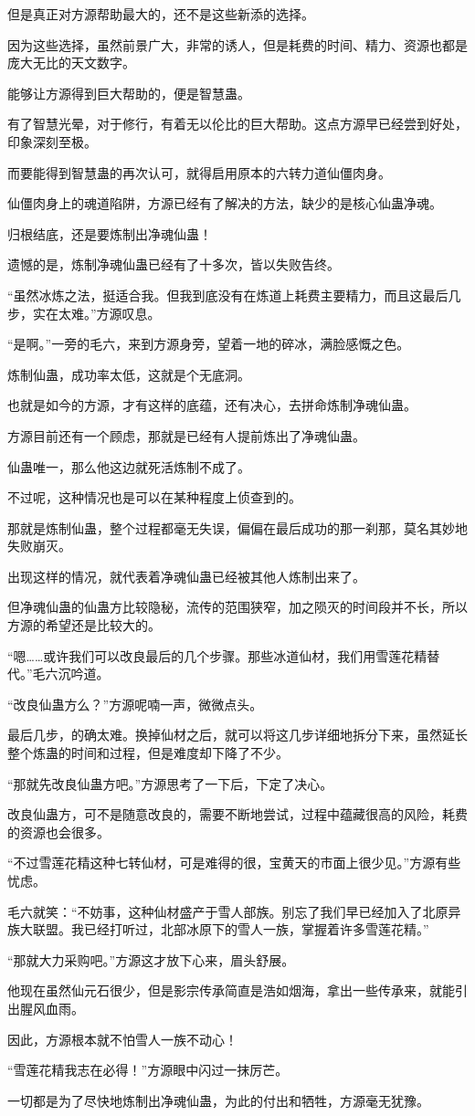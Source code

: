 \begin{this_body}
但是真正对方源帮助最大的，还不是这些新添的选择。

因为这些选择，虽然前景广大，非常的诱人，但是耗费的时间、精力、资源也都是庞大无比的天文数字。

能够让方源得到巨大帮助的，便是智慧蛊。

有了智慧光晕，对于修行，有着无以伦比的巨大帮助。这点方源早已经尝到好处，印象深刻至极。

而要能得到智慧蛊的再次认可，就得启用原本的六转力道仙僵肉身。

仙僵肉身上的魂道陷阱，方源已经有了解决的方法，缺少的是核心仙蛊净魂。

归根结底，还是要炼制出净魂仙蛊！

遗憾的是，炼制净魂仙蛊已经有了十多次，皆以失败告终。

“虽然冰炼之法，挺适合我。但我到底没有在炼道上耗费主要精力，而且这最后几步，实在太难。”方源叹息。

“是啊。”一旁的毛六，来到方源身旁，望着一地的碎冰，满脸感慨之色。

炼制仙蛊，成功率太低，这就是个无底洞。

也就是如今的方源，才有这样的底蕴，还有决心，去拼命炼制净魂仙蛊。

方源目前还有一个顾虑，那就是已经有人提前炼出了净魂仙蛊。

仙蛊唯一，那么他这边就死活炼制不成了。

不过呢，这种情况也是可以在某种程度上侦查到的。

那就是炼制仙蛊，整个过程都毫无失误，偏偏在最后成功的那一刹那，莫名其妙地失败崩灭。

出现这样的情况，就代表着净魂仙蛊已经被其他人炼制出来了。

但净魂仙蛊的仙蛊方比较隐秘，流传的范围狭窄，加之陨灭的时间段并不长，所以方源的希望还是比较大的。

“嗯……或许我们可以改良最后的几个步骤。那些冰道仙材，我们用雪莲花精替代。”毛六沉吟道。

“改良仙蛊方么？”方源呢喃一声，微微点头。

最后几步，的确太难。换掉仙材之后，就可以将这几步详细地拆分下来，虽然延长整个炼蛊的时间和过程，但是难度却下降了不少。

“那就先改良仙蛊方吧。”方源思考了一下后，下定了决心。

改良仙蛊方，可不是随意改良的，需要不断地尝试，过程中蕴藏很高的风险，耗费的资源也会很多。

“不过雪莲花精这种七转仙材，可是难得的很，宝黄天的市面上很少见。”方源有些忧虑。

毛六就笑：“不妨事，这种仙材盛产于雪人部族。别忘了我们早已经加入了北原异族大联盟。我已经打听过，北部冰原下的雪人一族，掌握着许多雪莲花精。”

“那就大力采购吧。”方源这才放下心来，眉头舒展。

他现在虽然仙元石很少，但是影宗传承简直是浩如烟海，拿出一些传承来，就能引出腥风血雨。

因此，方源根本就不怕雪人一族不动心！

“雪莲花精我志在必得！”方源眼中闪过一抹厉芒。

一切都是为了尽快地炼制出净魂仙蛊，为此的付出和牺牲，方源毫无犹豫。

\end{this_body}

